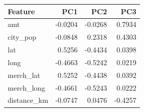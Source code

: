 \begin{tabular}{lrrr}
\toprule
Feature & PC1 & PC2 & PC3 \\
\midrule
amt & -0.0204 & -0.0268 & 0.7934 \\
city\_pop & -0.0848 & 0.2318 & 0.4303 \\
lat & 0.5256 & -0.4434 & 0.0398 \\
long & -0.4663 & -0.5242 & 0.0219 \\
merch\_lat & 0.5252 & -0.4438 & 0.0392 \\
merch\_long & -0.4661 & -0.5243 & 0.0222 \\
distance\_km & -0.0747 & 0.0476 & -0.4257 \\
\bottomrule
\end{tabular}
